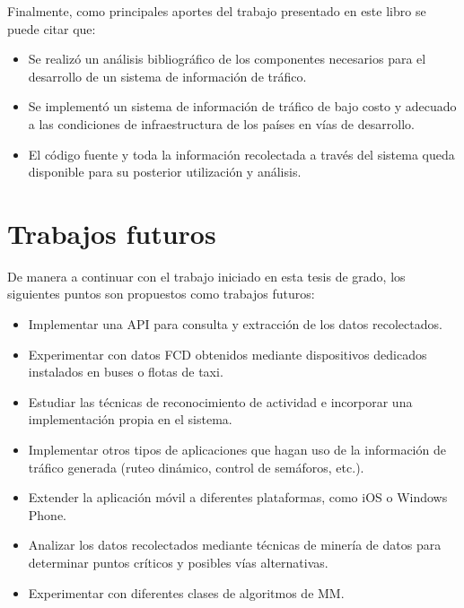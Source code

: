 Finalmente, como principales aportes del trabajo presentado en este libro se puede citar que:

\begin{itemize}
\item Se realizó un análisis bibliográfico de los componentes necesarios para el desarrollo de un sistema de información de tráfico.

\item Se implementó un sistema de información de tráfico de bajo costo y adecuado a las condiciones de infraestructura de los países en vías de desarrollo.

\item El código fuente y toda la información recolectada a través del sistema queda disponible para su posterior utilización y análisis.
\end{itemize}

\section{Trabajos futuros}

De manera a continuar con el trabajo iniciado en esta tesis de grado, los siguientes puntos son propuestos como trabajos futuros:

\begin{itemize}
\item Implementar una API para consulta y extracción de los datos recolectados. 

\item Experimentar con datos FCD obtenidos mediante dispositivos dedicados instalados en buses o flotas de taxi.

\item Estudiar las técnicas de reconocimiento de actividad e incorporar una implementación propia en el sistema.

\item Implementar otros tipos de aplicaciones que hagan uso de la información de tráfico generada (ruteo dinámico, control de semáforos, etc.).

\item Extender la aplicación móvil a diferentes plataformas, como iOS o Windows Phone.

\item Analizar los datos recolectados mediante técnicas de minería de datos para determinar puntos críticos y posibles vías alternativas.

\item Experimentar con diferentes clases de algoritmos de MM.
\end{itemize}

